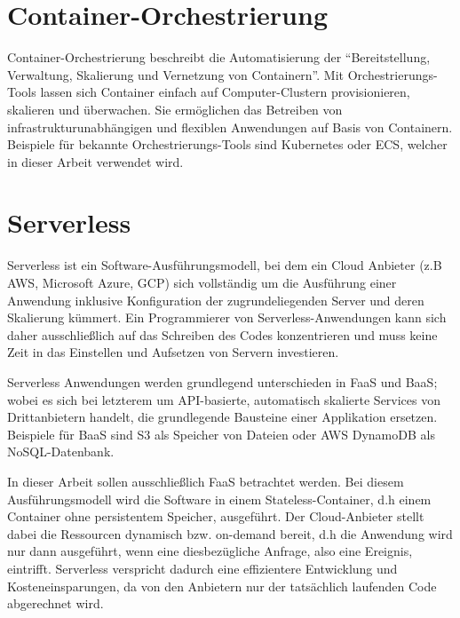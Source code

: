 \section{Container-Orchestrierung}
Container-Orchestrierung beschreibt die Automatisierung der \linebreak "`Bereitstellung, Verwaltung, Skalierung und Vernetzung von Containern"'\cite{noauthor_was_nodate}. Mit Orchestrierungs-Tools lassen sich Container einfach auf Computer-\linebreak Clustern provisionieren, skalieren und überwachen. Sie ermöglichen das Betreiben von infrastrukturunabhängigen und flexiblen Anwendungen auf Basis von Containern\cite{noauthor_was_nodate-1}. Beispiele für bekannte Orchestrierungs-Tools sind Kubernetes oder \ac{ECS}, welcher in dieser Arbeit verwendet wird.

\section{Serverless}
Serverless ist ein Software-Ausführungsmodell, bei dem ein Cloud Anbieter (z.B \ac{AWS}, Microsoft Azure, \ac{GCP}) sich vollständig um die Ausführung einer Anwendung inklusive Konfiguration der zugrundeliegenden Server und deren Skalierung kümmert. Ein Programmierer von Serverless-Anwendungen kann sich daher ausschließlich auf das Schreiben des Codes konzentrieren und muss keine Zeit in das Einstellen und Aufsetzen von Servern investieren\cite{ken_owens_cncf_2018}. 

Serverless Anwendungen werden grundlegend unterschieden in \ac{FaaS} und \ac{BaaS}; wobei es sich bei letzterem um API-basierte, automatisch skalierte Services von Drittanbietern handelt, die grundlegende Bausteine einer Applikation ersetzen\cite{ken_owens_cncf_2018}. Beispiele für \ac{BaaS} sind \ac{S3} als Speicher von Dateien oder \ac{AWS} DynamoDB als NoSQL-Datenbank.

In dieser Arbeit sollen ausschließlich \ac{FaaS} betrachtet werden. Bei diesem Ausführungsmodell wird die Software in einem Stateless-Container, d.h einem Container ohne persistentem Speicher, ausgeführt. Der Cloud-Anbieter stellt dabei die Ressourcen dynamisch bzw. on-demand bereit, d.h die Anwendung wird nur dann ausgeführt, wenn eine diesbezügliche Anfrage, also eine Ereignis, eintrifft. Serverless verspricht dadurch eine effizientere Entwicklung und Kosteneinsparungen, da von den Anbietern nur der tatsächlich laufenden Code abgerechnet wird\cite{noauthor_was_2016}. 

